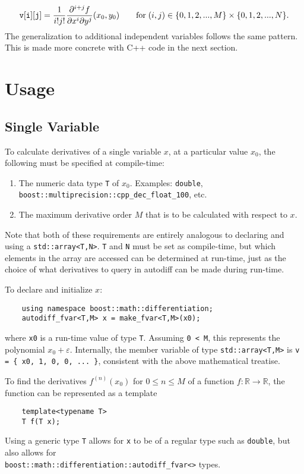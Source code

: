 \documentclass{article}
\begin{document}
\[
{\tt v[i][j]} = \frac{1}{i!j!}\frac{\partial^{i+j}f}{\partial x^i\partial y^j}(x_0,y_0)
    \qquad \text{for}\; (i,j)\in\{0,1,2,...,M\}\times\{0,1,2,...,N\}.
\]
The generalization to additional independent variables follows the same pattern. This is made more concrete with
C++ code in the next section.

\section{Usage}

\subsection{Single Variable}

To calculate derivatives of a single variable $x$, at a particular value $x_0$, the following must be
specified at compile-time:

\begin{enumerate}
\item The numeric data type {\tt T} of $x_0$. Examples: {\tt double},
    {\tt boost::multiprecision::cpp\_dec\_float\_100}, etc.
\item The maximum derivative order $M$ that is to be calculated with respect to $x$.
\end{enumerate}
Note that both of these requirements are entirely analogous to declaring and using a {\tt std::array<T,N>}. {\tt T}
and {\tt N} must be set as compile-time, but which elements in the array are accessed can be determined at run-time,
just as the choice of what derivatives to query in autodiff can be made during run-time.

To declare and initialize $x$:

\begin{verbatim}
    using namespace boost::math::differentiation;
    autodiff_fvar<T,M> x = make_fvar<T,M>(x0);
\end{verbatim}
where {\tt x0} is a run-time value of type {\tt T}. Assuming {\tt 0 < M}, this represents the polynomial $x_0 +
\varepsilon$. Internally, the member variable of type {\tt std::array<T,M>} is {\tt v = \{ x0, 1, 0, 0, ... \}},
consistent with the above mathematical treatise.

To find the derivatives $f^{(n)}(x_0)$ for $0\le n\le M$ of a function
$f : \mathbb{R}\rightarrow\mathbb{R}$, the function can be represented as a template

\begin{verbatim}
    template<typename T>
    T f(T x);
\end{verbatim}
Using a generic type {\tt T} allows for {\tt x} to be of a regular type such as {\tt double}, but also allows for\\
{\tt boost::math::differentiation::autodiff\_fvar<>} types.
\end{document}
